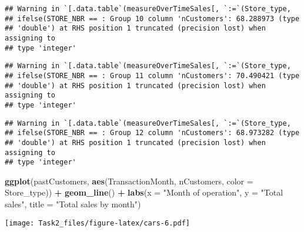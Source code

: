 \documentclass[
]{article}
\newenvironment{Shaded}{\begin{snugshade}}{\end{snugshade}}
\newcommand{\DataTypeTok}[1]{\textcolor[rgb]{0.13,0.29,0.53}{#1}}
\newcommand{\KeywordTok}[1]{\textcolor[rgb]{0.13,0.29,0.53}{\textbf{#1}}}
\newcommand{\NormalTok}[1]{#1}
\newcommand{\OperatorTok}[1]{\textcolor[rgb]{0.81,0.36,0.00}{\textbf{#1}}}
\newcommand{\StringTok}[1]{\textcolor[rgb]{0.31,0.60,0.02}{#1}}
\begin{document}
\begin{verbatim}
## Warning in `[.data.table`(measureOverTimeSales[, `:=`(Store_type,
## ifelse(STORE_NBR == : Group 10 column 'nCustomers': 68.288973 (type
## 'double') at RHS position 1 truncated (precision lost) when assigning to
## type 'integer'
\end{verbatim}

\begin{verbatim}
## Warning in `[.data.table`(measureOverTimeSales[, `:=`(Store_type,
## ifelse(STORE_NBR == : Group 11 column 'nCustomers': 70.490421 (type
## 'double') at RHS position 1 truncated (precision lost) when assigning to
## type 'integer'
\end{verbatim}

\begin{verbatim}
## Warning in `[.data.table`(measureOverTimeSales[, `:=`(Store_type,
## ifelse(STORE_NBR == : Group 12 column 'nCustomers': 68.973282 (type
## 'double') at RHS position 1 truncated (precision lost) when assigning to
## type 'integer'
\end{verbatim}

\begin{Shaded}
\begin{Highlighting}[]
\KeywordTok{ggplot}\NormalTok{(pastCustomers, }\KeywordTok{aes}\NormalTok{(TransactionMonth, nCustomers, }\DataTypeTok{color =}\NormalTok{ Store_type)) }\OperatorTok{+}
\StringTok{  }\KeywordTok{geom_line}\NormalTok{() }\OperatorTok{+}
\StringTok{  }\KeywordTok{labs}\NormalTok{(}\DataTypeTok{x =} \StringTok{"Month of operation"}\NormalTok{, }\DataTypeTok{y =} \StringTok{"Total sales"}\NormalTok{, }\DataTypeTok{title =} \StringTok{"Total sales by month"}\NormalTok{)}
\end{Highlighting}
\end{Shaded}

\texttt{[image: Task2\_files/figure-latex/cars-6.pdf]}
\end{document}
